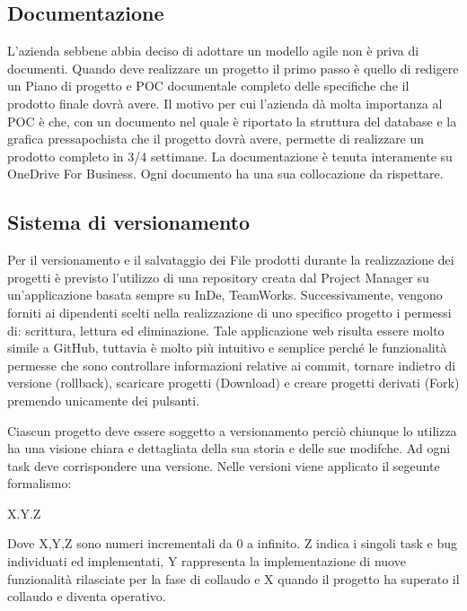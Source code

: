 \subsection{Documentazione}
\label{cap1:Documentazione}

L'azienda sebbene abbia deciso di adottare un modello agile non è priva di documenti. Quando deve realizzare un progetto il primo passo è quello di redigere un Piano di progetto e POC documentale completo delle specifiche che il prodotto finale dovrà avere. 
Il motivo per cui l'azienda dà molta importanza al POC è che, con un documento nel quale è riportato la struttura del database e la grafica pressapochista che il progetto dovrà avere, permette di realizzare un prodotto completo in 3/4 settimane. 
La documentazione è tenuta interamente su OneDrive For Business. Ogni documento ha una sua collocazione da rispettare. 

\subsection{Sistema di versionamento}
\label{cap1:Sistema di versionamento}

Per il versionamento e il salvataggio dei File prodotti durante la realizzazione dei progetti è previsto l'utilizzo di una repository creata dal Project Manager su un'applicazione basata sempre su InDe, TeamWorks. Successivamente, vengono forniti ai dipendenti scelti nella realizzazione di uno specifico progetto i permessi di: scrittura, lettura ed eliminazione.
Tale applicazione web risulta essere molto simile a GitHub, tuttavia è molto più intuitivo e semplice perché le funzionalità permesse che sono controllare informazioni relative ai commit, tornare indietro di versione (rollback), scaricare progetti (Download) e creare progetti derivati (Fork) premendo unicamente dei pulsanti.

Ciascun progetto deve essere soggetto a versionamento perciò chiunque lo utilizza ha una visione chiara e dettagliata della sua storia e delle sue modifche. Ad ogni task deve corrispondere una versione. Nelle versioni viene applicato il segeunte formalismo:
\begin{center}
	X.Y.Z
\end{center}
Dove X,Y,Z sono numeri incrementali da 0 a infinito. 
Z indica i singoli task e bug individuati ed implementati, Y rappresenta la implementazione di nuove funzionalità rilasciate per la fase di collaudo e X quando il progetto ha superato il collaudo e diventa operativo.  


